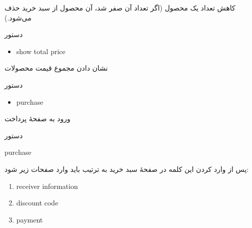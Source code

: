 \documentclass[]{article}
\begin{document}
کاهش تعداد یک محصول (اگر تعداد آن صفر شد،‌ آن محصول از سبد خرید حذف می‌شود.)




\begin{mybox}[colback=brilliantlavender]{دستور}

\begin{latin}

\begin{itemize}[label = {$\Rightarrow$}]

\item
show total price

\end{itemize}

\end{latin}

\end{mybox}

نشان دادن مجموع قیمت محصولات


\begin{mybox}[colback=brilliantlavender]{دستور}

\begin{latin}

\begin{itemize}[label = {$\Rightarrow$}]

\item
purchase

\end{itemize}

\end{latin}

\end{mybox}

ورود به صفحهٔ پرداخت

\hrulefill

\begin{mybox}[colback=yellow]{دستور}

\begin{latin}

purchase

\end{latin}

\end{mybox}

پس از وارد کردن این کلمه در صفحهٔ سبد خرید به ترتیب باید وارد صفحات زیر شود:


\begin{latin}

\begin{enumerate}

\item
receiver information

\item
discount code

\item
payment


\end{enumerate}


\end{latin}
\end{document}
